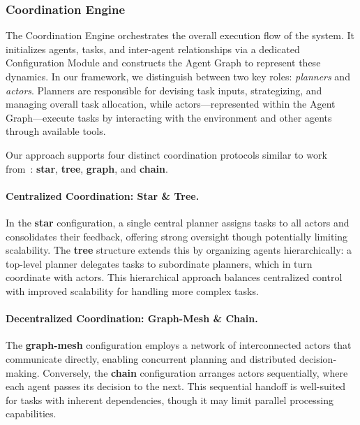\subsubsection{Coordination Engine} 
The Coordination Engine orchestrates the overall execution flow of the system. It initializes agents, tasks, and inter-agent relationships via a dedicated Configuration Module and constructs the Agent Graph to represent these dynamics. In our framework, we distinguish between two key roles: \emph{planners} and \emph{actors}. Planners are responsible for devising task inputs, strategizing, and managing overall task allocation, while actors—represented within the Agent Graph—execute tasks by interacting with the environment and other agents through available tools.

Our approach supports four distinct coordination protocols similar to work from~\citet{qian2025scaling}: \textbf{star}, \textbf{tree}, \textbf{graph}, and \textbf{chain}.


\paragraph{Centralized Coordination: Star \& Tree.}
In the \textbf{star} configuration, a single central planner assigns tasks to all actors and consolidates their feedback, offering strong oversight though potentially limiting scalability. The \textbf{tree} structure extends this by organizing agents hierarchically: a top-level planner delegates tasks to subordinate planners, which in turn coordinate with actors. This hierarchical approach balances centralized control with improved scalability for handling more complex tasks.

\paragraph{Decentralized Coordination: Graph-Mesh \& Chain.}
The \textbf{graph-mesh} configuration employs a network of interconnected actors that communicate directly, enabling concurrent planning and distributed decision-making. Conversely, the \textbf{chain} configuration arranges actors sequentially, where each agent passes its decision to the next. This sequential handoff is well-suited for tasks with inherent dependencies, though it may limit parallel processing capabilities.

